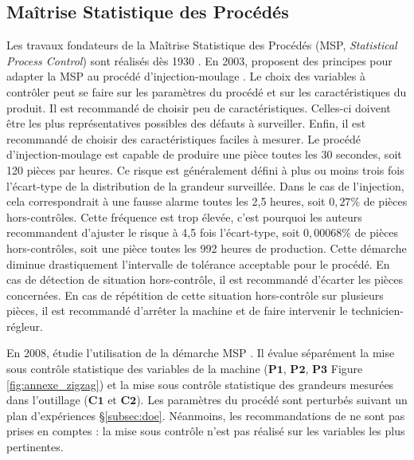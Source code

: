 \subsection{Maîtrise Statistique des Procédés} \label{parag:spc}
Les travaux fondateurs de la Maîtrise Statistique des Procédés (MSP, \textit{Statistical Process Control}) sont réalisés dès 1930 \cite{shewhart_economic_1930, shewhart_economic_1931}.
En 2003, \citeauthor{pillet_maitrise_2003} proposent des principes pour adapter la MSP au procédé d'injection-moulage \cite{pillet_maitrise_2003}.
Le choix des variables à contrôler peut se faire sur les paramètres du procédé et sur les caractéristiques du produit.
Il est recommandé de choisir peu de caractéristiques.
Celles-ci doivent être les plus représentatives possibles des défauts à surveiller.
Enfin, il est recommandé de choisir des caractéristiques faciles à mesurer.
Le procédé d'injection-moulage est capable de produire une pièce toutes les 30 secondes, soit 120 pièces par heures.  %
Ce risque est généralement défini à plus ou moins trois fois l'écart-type de la distribution de la grandeur surveillée.
Dans le cas de l'injection, cela correspondrait à une fausse alarme toutes les 2,5 heures, soit $0,27\%$ de pièces hors-contrôles.
Cette fréquence est trop élevée, c'est pourquoi les auteurs recommandent d'ajuster le risque à 4,5 fois l'écart-type, soit $0,00068\%$ de pièces hors-contrôles, soit une pièce toutes les 992 heures de production.
Cette démarche diminue drastiquement l'intervalle de tolérance acceptable pour le procédé.
En cas de détection de situation hors-contrôle, il est recommandé d'écarter les pièces concernées.
En cas de répétition de cette situation hors-contrôle sur plusieurs pièces, il est recommandé d'arrêter la machine et de faire intervenir le technicien-régleur.

En 2008, \citeauthor{kazmer_comparison_2008} étudie l'utilisation de la démarche MSP \cite{kazmer_comparison_2008}.
Il évalue séparément la mise sous contrôle statistique des variables de la machine ($\boldsymbol{P1}$, $\boldsymbol{P2}$, $\boldsymbol{P3}$ Figure \ref{fig:annexe_zigzag}) et la mise sous contrôle statistique des grandeurs mesurées dans l'outillage ($\boldsymbol{C1}$ et $\boldsymbol{C2}$).
Les paramètres du procédé sont perturbés suivant un plan d'expériences §\ref{subsec:doe}.
Néanmoins, les recommandations de \citeauthor{pillet_maitrise_2003} \cite{pillet_maitrise_2003} ne sont pas prises en comptes : la mise sous contrôle n'est pas réalisé sur les variables les plus pertinentes.

